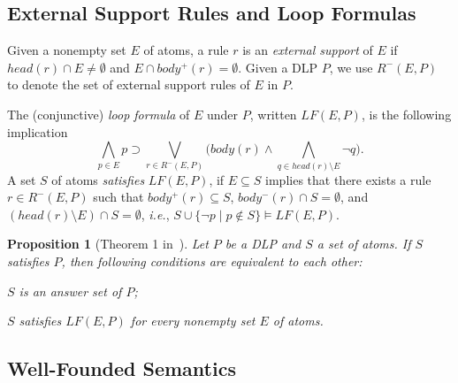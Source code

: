 \documentclass{article}
\makeatletter
\newenvironment{tight_itemize}{
\begin{itemize}
   \setlength{\itemsep}{0pt}%
  \setlength{\topsep}{0pt}%
  \setlength{\partopsep}{0pt}%
  \setlength{\parskip}{0pt}%
  \setlength{\parsep}{0pt}%
}{\end{itemize}}
\newtheorem{theorem}{Theorem}
\newtheorem{proposition}{Proposition}
\newcommand\ie{{\it i.e.\@}}
\newcommand{\LF}{L\!F}
\makeatother
\begin{document}


\subsection{External Support Rules and Loop Formulas}


Given a nonempty set $E$ of atoms,
a rule $r$ is an \textit{external support} of $E$ if $head(r)\cap E\neq
\emptyset$ and $E\cap body^+(r) = \emptyset$.
Given a DLP $P$, we use $R^-(E, P)$ to denote the set of external support rules of $E$ in $P$.

The (conjunctive) {\em loop formula} of $E$ under $P$, written $\LF(E, P)$, is the following implication
\[
\bigwedge_{p\in E} p\supset \bigvee_{r\in R^-(E, P)} \Big(body(r)\land\bigwedge_{q\in head(r)\setminus E} \lnot
q\Big).
\]
A set $S$ of atoms {\em satisfies} $\LF(E, P)$, if $E\subseteq S$ implies that there exists a rule $r\in R^-(E, P)$ such that $body^+(r)\subseteq S$, $body^-(r)\cap S=\emptyset$, and $(head(r)\setminus E)\cap S=\emptyset$, \ie, $S\cup \{ \neg p\mid p\notin S\}\models \LF(E, P)$.

\begin{proposition}[Theorem 1 in~\cite{LeeLifschitz:disj}]\label{them:1}
Let $P$ be a DLP and $S$ a set of atoms. If $S$ satisfies $P$, then following conditions are equivalent to each other:
\begin{tight_itemize}
\item $S$ is an answer set of $P$;
\item $S$ satisfies $\LF(E, P)$ for every nonempty set $E$ of atoms.
\end{tight_itemize}
\end{proposition}



\subsection{Well-Founded Semantics}
\end{document}
